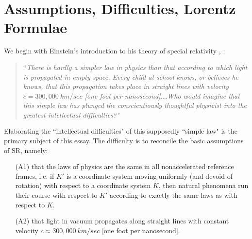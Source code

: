 \documentclass[12pt]{article}
\newcommand{\bR}{\mathbb{R}}
\newcommand{\del}{\partial}
\begin{document}


\section{Assumptions, Difficulties, Lorentz Formulae}\label{s1}

We begin with Einstein's introduction to his theory of special relativity \cite{einstein1905electrodynamics}, \cite[Ch7, 11]{einstein2019relativity}: 

\begin{quote} 
``\emph{There is hardly a simpler law in physics than that according to which light is propagated in empty space. Every child at school knows, or believes he knows, that this propagation takes place in straight lines with velocity $c=300,000 ~km/sec$ [one foot per nanosecond].\ldots Who would imagine that this simple law has plunged the conscientiously thoughtful physicist into the greatest intellectual difficulties?"} 
\end{quote}

Elaborating the ``intellectual difficulties" of this supposedly ``simple law" is the primary subject of this essay. The difficulty is to reconcile the basic assumptions of SR, namely:
\begin{itemize}

\item[(A1)] that the laws of physics are the same in all nonaccelerated reference frames, i.e. if $K'$ is a coordinate system moving uniformly (and devoid of rotation) with respect to a coordinate system $K$, then natural phenomena run their course with respect to $K'$ according to exactly the same laws as with respect to $K$. 

\item[(A2)] that light in vacuum propagates along straight lines with constant velocity $c\approx 300,000 ~km/sec$ [one foot per nanosecond].

\end{itemize}
\end{document}
